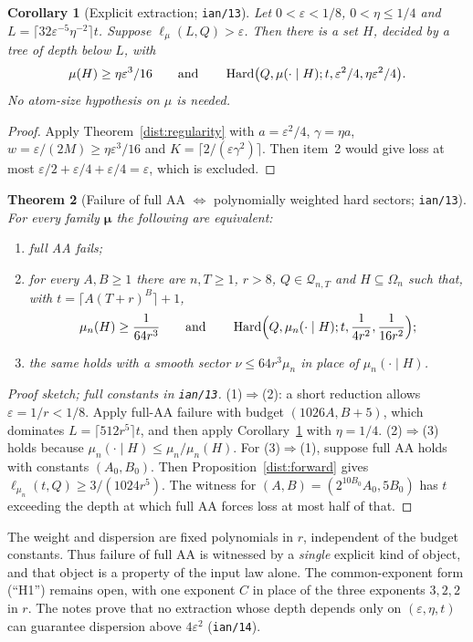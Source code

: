 \documentclass[11pt]{article}
\newtheorem{theorem}{Theorem}[section]
\newtheorem{corollary}[theorem]{Corollary}
\theoremstyle{definition}\newtheorem{definition}[theorem]{Definition}
\theoremstyle{remark}\newtheorem{remark}[theorem]{Remark}
\newcommand{\mc}{\mathcal}\newcommand{\eps}{\varepsilon}
\begin{document}
\begin{corollary}[Explicit extraction; \texttt{ian/13}]\label{dist:extraction}
Let \(0<\eps<1/8\), \(0<\eta\le1/4\) and
\(L=\lceil32\eps^{-5}\eta^{-2}\rceil t\). Suppose \(\ell_\mu(L,Q)>\eps\). Then
there is a set \(H\), decided by a tree of depth below \(L\), with
\[
 \mu(H)\ge\eta\eps^3/16
 \qquad\text{and}\qquad
 \Hard\bigl(Q,\mu(\cdot\mid H);t,\eps^2/4,\eta\eps^2/4\bigr).
\]
No atom-size hypothesis on \(\mu\) is needed.
\end{corollary}
\begin{proof}
Apply Theorem~\ref{dist:regularity} with \(a=\eps^2/4\), \(\gamma=\eta a\),
\(w=\eps/(2M)\ge\eta\eps^3/16\) and \(K=\lceil2/(\eps\gamma^2)\rceil\). Then
item~2 would give loss at most \(\eps/2+\eps/4+\eps/4=\eps\), which is excluded.
\end{proof}

\begin{theorem}[Failure of full AA \(\iff\) polynomially weighted hard sectors; \texttt{ian/13}]\label{dist:equivalence}
For every family \(\boldsymbol\mu\) the following are equivalent:
\begin{enumerate}
\item full AA fails;
\item for every \(A,B\ge1\) there are \(n,T\ge1\), \(r>8\),
\(Q\in\mc Q_{n,T}\) and \(H\subseteq\Omega_n\) such that, with
\(t=\lceil A(T+r)^B\rceil+1\),
\[
 \mu_n(H)\ge\frac1{64r^3}
 \qquad\text{and}\qquad
 \operatorname{Hard}\Bigl(Q,\mu_n(\cdot\mid H);t,\frac1{4r^2},\frac1{16r^2}\Bigr);
\]
\item the same holds with a smooth sector \(\nu\le64r^3\mu_n\) in place of
\(\mu_n(\cdot\mid H)\).
\end{enumerate}
\end{theorem}
\begin{proof}[Proof sketch; full constants in \texttt{ian/13}]
(1)\(\Rightarrow\)(2): a short reduction allows \(\eps=1/r<1/8\). Apply full-AA
failure with budget \((1026A,B+5)\), which dominates
\(L=\lceil512r^5\rceil t\), and then apply Corollary~\ref{dist:extraction} with
\(\eta=1/4\). (2)\(\Rightarrow\)(3) holds because
\(\mu_n(\cdot\mid H)\le\mu_n/\mu_n(H)\). For (3)\(\Rightarrow\)(1), suppose full
AA holds with constants \((A_0,B_0)\). Then
Proposition~\ref{dist:forward} gives \(\ell_{\mu_n}(t,Q)\ge3/(1024r^5)\). The
witness for \((A,B)=(2^{10B_0}A_0,5B_0)\) has \(t\) exceeding the depth at which
full AA forces loss at most half of that.
\end{proof}
The weight and dispersion are fixed polynomials in \(r\), independent of the
budget constants. Thus failure of full AA is witnessed by a \emph{single}
explicit kind of object, and that object is a property of the input law alone.
The common-exponent form (``H1'') remains open, with one exponent \(C\) in place
of the three exponents \(3,2,2\) in \(r\). The notes prove that no extraction
whose depth depends only on \((\eps,\eta,t)\) can guarantee dispersion above
\(4\eps^2\) (\texttt{ian/14}).
\end{document}
